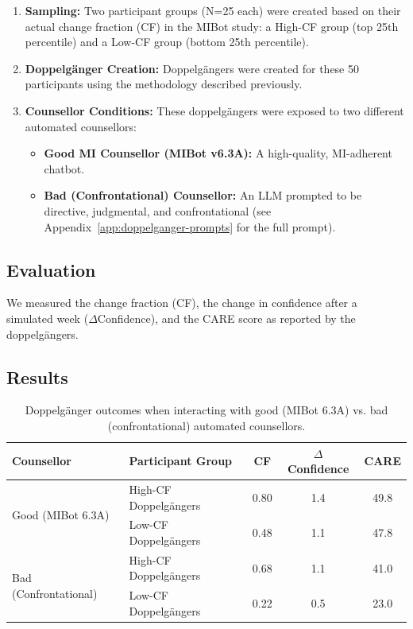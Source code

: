 \begin{enumerate}
    \item \textbf{Sampling:} Two participant groups (N=25 each) were created based on their actual change fraction (CF) in the MIBot study: a High-CF group (top 25th percentile) and a Low-CF group (bottom 25th percentile).

    \item \textbf{Doppelgänger Creation:} Doppelgängers were created for these 50 participants using the methodology described previously.
    
    \item \textbf{Counsellor Conditions:} These doppelgängers were exposed to two different automated counsellors:
    \begin{itemize}
        \item \textbf{Good MI Counsellor (MIBot v6.3A):} A high-quality, MI-adherent chatbot.
        
        \item \textbf{Bad (Confrontational) Counsellor:} An LLM prompted to be directive, judgmental, and confrontational (see Appendix~\ref{app:doppelganger-prompts} for the full prompt).
    \end{itemize}
\end{enumerate}

\subsection{Evaluation}
We measured the change fraction (CF), the change in confidence after a simulated week ($\Delta$Confidence), and the CARE score as reported by the doppelgängers.

\subsection{Results}

\begin{table}[ht!]
\centering
\begin{tabular}{@{}llccc@{}}
\toprule
\textbf{Counsellor} & \textbf{Participant Group} & \textbf{CF} & \textbf{$\Delta$Confidence} & \textbf{CARE} \\ \midrule
\multirow{2}{*}{Good (MIBot 6.3A)} & High-CF Doppelgängers & 0.80 & 1.4 & 49.8 \\
& Low-CF Doppelgängers & 0.48 & 1.1 & 47.8 \\ \midrule
\multirow{2}{*}{Bad (Confrontational)} & High-CF Doppelgängers & 0.68 & 1.1 & 41.0 \\
& Low-CF Doppelgängers & 0.22 & 0.5 & 23.0 \\ \bottomrule
\end{tabular}
\caption[Effect of counselling quality on doppelgängers' motivational language.]{Doppelgänger outcomes when interacting with good (MIBot 6.3A) vs. bad (confrontational) automated counsellors.}
\label{tab:good-vs-bad-counselling}
\end{table}

